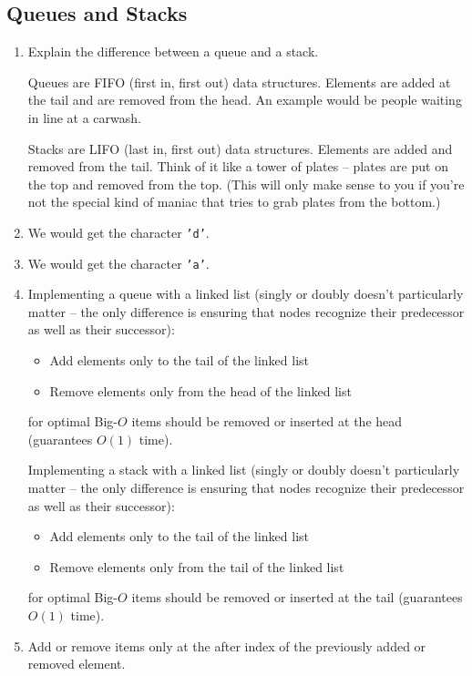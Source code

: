 \documentclass[10pt]{article}
\begin{document}
\subsection{Queues and Stacks}
\begin{enumerate}[leftmargin=0em]\addtocounter{enumi}{17}
    \item Explain the difference between a queue and a stack.
    
    Queues are FIFO (first in, first out) data structures. Elements are added at the tail and are removed from the head. An example would be people waiting in line at a carwash.

    Stacks are LIFO (last in, first out) data structures. Elements are added and removed from the tail. Think of it like a tower of plates -- plates are put on the top and removed from the top. (This will only make sense to you if you're not the special kind of maniac that tries to grab plates from the bottom.)

    \item We would get the character \texttt{'d'}.
    \item We would get the character \texttt{'a'}.
    \item Implementing a queue with a linked list (singly or doubly doesn't particularly matter -- the only difference is ensuring that nodes recognize their predecessor as well as their successor):
    \begin{itemize}
        \item Add elements only to the tail of the linked list
        \item Remove elements only from the head of the linked list
    \end{itemize}
    for optimal Big-$O$ items should be removed or inserted at the head (guarantees $O(1)$ time).

    Implementing a stack with a linked list (singly or doubly doesn't particularly matter -- the only difference is ensuring that nodes recognize their predecessor as well as their successor):
    \begin{itemize}
        \item Add elements only to the tail of the linked list
        \item Remove elements only from the tail of the linked list
    \end{itemize}
    for optimal Big-$O$ items should be removed or inserted at the tail (guarantees $O(1)$ time).
    \item Add or remove items only at the after index of the previously added or removed element. 
    

\end{enumerate}
\end{document}

